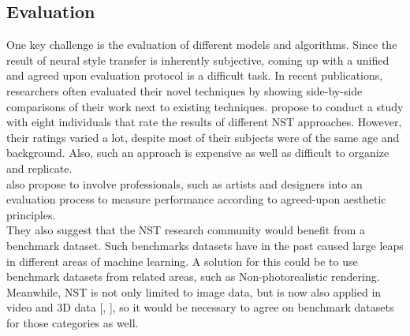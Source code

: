 \documentclass{seminar}
\begin{document}
	\subsection{Evaluation}
	One key challenge is the evaluation of different models and algorithms. Since the result of neural style transfer is inherently subjective, coming up with a unified and agreed upon evaluation protocol is a difficult task. In recent publications, researchers often evaluated their novel techniques by showing side-by-side comparisons of their work next to existing techniques. \cite{jing2019neural} propose to conduct a study with eight individuals that rate the results of different NST approaches. However, their ratings varied a lot, despite most of their subjects were of the same age and background. Also, such an approach is expensive as well as difficult to organize and replicate.\\
	\cite{jing2019neural} also propose to involve professionals, such as artists and designers into an evaluation process to measure performance according to agreed-upon aesthetic principles.\\
	They also suggest that the NST research community would benefit from a benchmark dataset. Such benchmarks datasets have in the past caused large leaps in different areas of machine learning. A solution for this could be to use benchmark datasets from related areas, such as Non-photorealistic rendering. Meanwhile, NST is not only limited to image data, but is now also applied in video and 3D data [\cite{huang2017real}, \cite{kato2018neural}], so it would be necessary to agree on benchmark datasets for those categories as well.
	
	
\end{document}
